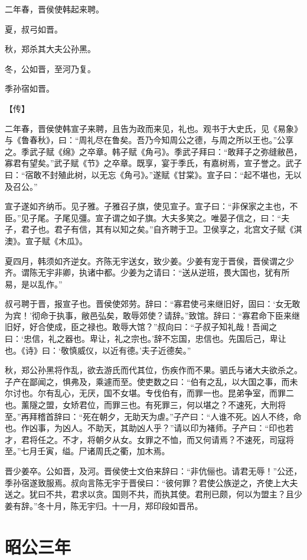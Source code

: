 \documentclass[a4paper,12pt,UTF8,twoside]{ctexbook}
\begin{document}
二年春，晋侯使韩起来聘。

夏，叔弓如晋。

秋，郑杀其大夫公孙黑。

冬，公如晋，至河乃复。

季孙宿如晋。

【传】

二年春，晋侯使韩宣子来聘，且告为政而来见，礼也。观书于大史氏，见《易象》与《鲁春秋》，曰：“周礼尽在鲁矣。吾乃今知周公之德，与周之所以王也。”公享之。季武子赋《绵》之卒章。韩子赋《角弓》。季武子拜曰：“敢拜子之弥缝敝邑，寡君有望矣。”武子赋《节》之卒章。既享，宴于季氏，有嘉树焉，宣子誉之。武子曰：“宿敢不封殖此树，以无忘《角弓》。”遂赋《甘棠》。宣子曰：“起不堪也，无以及召公。”

宣子遂如齐纳币。见子雅。子雅召子旗，使见宣子。宣子曰：“非保家之主也，不臣。”见子尾。子尾见彊。宣子谓之如子旗。大夫多笑之。唯晏子信之，曰：“夫子，君子也。君子有信，其有以知之矣。”自齐聘于卫。卫侯享之，北宫文子赋《淇澳》。宣子赋《木瓜》。

夏四月，韩须如齐逆女。齐陈无宇送女，致少姜。少姜有宠于晋侯，晋侯谓之少齐。谓陈无宇非卿，执诸中都。少姜为之请曰：“送从逆班，畏大国也，犹有所易，是以乱作。”

叔弓聘于晋，报宣子也。晋侯使郊劳。辞曰：“寡君使弓来继旧好，固曰：‘女无敢为宾！’彻命于执事，敝邑弘矣，敢辱郊使？请辞。”致馆。辞曰：“寡君命下臣来继旧好，好合使成，臣之禄也。敢辱大馆？”叔向曰：“子叔子知礼哉！吾闻之曰：‘忠信，礼之器也。卑让，礼之宗也。’辞不忘国，忠信也。先国后己，卑让也。《诗》曰：‘敬慎威仪，以近有德。’夫子近德矣。”

秋，郑公孙黑将作乱，欲去游氏而代其位，伤疾作而不果。驷氏与诸大夫欲杀之。子产在鄙闻之，惧弗及，乘遽而至。使吏数之曰：“伯有之乱，以大国之事，而未尔讨也。尔有乱心，无厌，国不女堪。专伐伯有，而罪一也。昆弟争室，而罪二也。薰隧之盟，女矫君位，而罪三也。有死罪三，何以堪之？不速死，大刑将至。”再拜稽首辞曰：“死在朝夕，无助天为虐。”子产曰：“人谁不死。凶人不终，命也。作凶事，为凶人。不助天，其助凶人乎？”请以印为褚师。子产曰：“印也若才，君将任之。不才，将朝夕从女。女罪之不恤，而又何请焉？不速死，司寇将至。”七月壬寅，缢。尸诸周氏之衢，加木焉。

晋少姜卒。公如晋，及河。晋侯使士文伯来辞曰：“非伉俪也。请君无辱！”公还，季孙宿遂致服焉。叔向言陈无宇于晋侯曰：“彼何罪？君使公族逆之，齐使上大夫送之。犹曰不共，君求以贪。国则不共，而执其使。君刑已颇，何以为盟主？且少姜有辞。”冬十月，陈无宇归。十一月，郑印段如晋吊。


\chapter{昭公三年}
\end{document}
